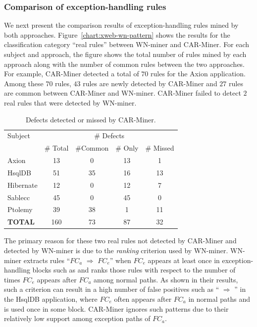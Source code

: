 \subsubsection{Comparison of exception-handling rules}
\label{sec:comp-weimer-patt}

We next present the comparison results of exception-handling rules mined by both approaches.
Figure~\ref{chart:xweb-wn-pattern} shows the results for the classification category ``real rules'' between WN-miner and CAR-Miner. For each subject and approach, the figure shows the total number of rules mined by each approach
along with the number of common rules between the two approaches. For example,
CAR-Miner detected a total of $70$ rules for the Axion application. Among these $70$ rules,
$43$ rules are newly detected by CAR-Miner and $27$ rules are common between CAR-Miner and WN-miner.
CAR-Miner failed to detect $2$ real rules that were detected by WN-miner. 

\setlength{\tabcolsep}{1pt}
\begin{table}[t]
\begin{SmallOut}
\begin{CodeOut}
\begin{center}
\centering \caption {\label{tab:CAR-Miner-Weimer-defect} Defects detected or missed by CAR-Miner.}
\begin {tabular} {|l|c|c|c|c|}
\hline
Subject&\multicolumn{4}{|c|}{\# Defects}\\
\cline{2-5}
&\# Total&\#Common&\# Only &\# Missed\\
\hline
\hline Axion & 13 & 0 & 13 & 1\\
\hline HsqlDB & 51 & 35 & 16 & 13\\
\hline Hibernate & 12 & 0 & 12 & 7\\
\hline Sablecc & 45 & 0 & 45 & 0\\
\hline Ptolemy & 39 & 38 & 1 & 11\\
\hline \textbf{TOTAL} & 160 & 73 & 87 & 32\\
\hline
\end{tabular}
\end{center}
\end{CodeOut}
\end{SmallOut}\vspace*{-4ex}
\end{table}

The primary reason for these two real rules not detected by CAR-Miner and
detected by WN-miner is due to the \emph{ranking} criterion used by WN-miner. 
WN-miner extracts rules ``$FC_a$ $\Rightarrow$ $FC_e$'' when $FC_e$
appears at least once in exception-handling blocks such as  and ranks those rules
with respect to the number of times $FC_e$ appears after $FC_a$
among normal paths. As shown in their results, such a criterion can result in a high number
of false positives such as `` $\Rightarrow$ '' in
the HsqlDB application, where $FC_e$ often appears after $FC_a$ in normal paths and is used
once in some  block. CAR-Miner ignores such patterns due
to their relatively low support among exception paths of $FC_a$.

